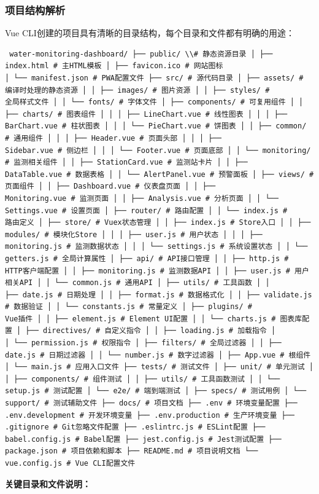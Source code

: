 \subsubsection{项目结构解析}\label{ux9879ux76eeux7ed3ux6784ux89e3ux6790} Vue CLI创建的项目具有清晰的目录结构，每个目录和文件都有明确的用途：
\begin{lstlisting} water-monitoring-dashboard/ ├── public/ \\# 静态资源目录 │ ├── index.html # 主HTML模板 │ ├── favicon.ico # 网站图标
│ └── manifest.json # PWA配置文件 ├── src/ # 源代码目录 │ ├── assets/ # 编译时处理的静态资源 │ │ ├── images/ # 图片资源 │ │ ├── styles/ #
全局样式文件 │ │ └── fonts/ # 字体文件 │ ├── components/ # 可复用组件 │ │ ├── charts/ # 图表组件 │ │ │ ├── LineChart.vue # 线性图表 │ │ │ ├──
BarChart.vue # 柱状图表 │ │ │ └── PieChart.vue # 饼图表 │ │ ├── common/ # 通用组件 │ │ │ ├── Header.vue # 页面头部 │ │ │ ├──
Sidebar.vue # 侧边栏 │ │ │ └── Footer.vue # 页面底部 │ │ └── monitoring/ # 监测相关组件 │ │ ├── StationCard.vue # 监测站卡片 │ │ ├──
DataTable.vue # 数据表格 │ │ └── AlertPanel.vue # 预警面板 │ ├── views/ # 页面组件 │ │ ├── Dashboard.vue # 仪表盘页面 │ │ ├──
Monitoring.vue # 监测页面 │ │ ├── Analysis.vue # 分析页面 │ │ └── Settings.vue # 设置页面 │ ├── router/ # 路由配置 │ │ └── index.js #
路由定义 │ ├── store/ # Vuex状态管理 │ │ ├── index.js # Store入口 │ │ ├── modules/ # 模块化Store │ │ │ ├── user.js # 用户状态 │ │ │ ├──
monitoring.js # 监测数据状态 │ │ │ └── settings.js # 系统设置状态 │ │ └── getters.js # 全局计算属性 │ ├── api/ # API接口管理 │ │ ├── http.js #
HTTP客户端配置 │ │ ├── monitoring.js # 监测数据API │ │ ├── user.js # 用户相关API │ │ └── common.js # 通用API │ ├── utils/ # 工具函数 │ │
├── date.js # 日期处理 │ │ ├── format.js # 数据格式化 │ │ ├── validate.js # 数据验证 │ │ └── constants.js # 常量定义 │ ├── plugins/ #
Vue插件 │ │ ├── element.js # Element UI配置 │ │ └── charts.js # 图表库配置 │ ├── directives/ # 自定义指令 │ │ ├── loading.js # 加载指令 │
│ └── permission.js # 权限指令 │ ├── filters/ # 全局过滤器 │ │ ├── date.js # 日期过滤器 │ │ └── number.js # 数字过滤器 │ ├── App.vue # 根组件
│ └── main.js # 应用入口文件 ├── tests/ # 测试文件 │ ├── unit/ # 单元测试 │ │ ├── components/ # 组件测试 │ │ ├── utils/ # 工具函数测试 │ │ └──
setup.js # 测试配置 │ └── e2e/ # 端到端测试 │ ├── specs/ # 测试用例 │ └── support/ # 测试辅助文件 ├── docs/ # 项目文档 ├── .env # 环境变量配置 ├──
.env.development # 开发环境变量 ├── .env.production # 生产环境变量 ├── .gitignore # Git忽略文件配置 ├── .eslintrc.js # ESLint配置 ├──
babel.config.js # Babel配置 ├── jest.config.js # Jest测试配置 ├── package.json # 项目依赖和脚本 ├── README.md # 项目说明文档 └──
vue.config.js # Vue CLI配置文件 \end{lstlisting} \textbf{关键目录和文件说明：}

